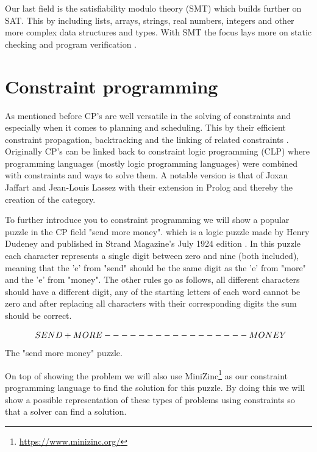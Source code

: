 Our last field is the satisfiability modulo theory (SMT) which builds further on SAT. This by including lists, arrays, strings, real numbers, integers and other more complex data structures and types. With SMT the focus lays more on static checking and program verification \cite{56bardin2019bringing, 54moura2008z3}.


\section{Constraint programming}
\label{CS:CP}
As mentioned before CP's are well versatile in the solving of constraints and especially when it comes to planning and scheduling. This by their efficient constraint propagation, backtracking and the linking of related constraints \cite{66WikiCP}. Originally CP's can be linked back to constraint logic programming (CLP) where programming languages (mostly logic programming languages) were combined with constraints and ways to solve them. A notable version is that of Joxan Jaffart and Jean-Louis Lassez \cite{65jaffar1987constraint, 66WikiCP} with their extension in Prolog and thereby the creation of the category.

To further introduce you to constraint programming we will show a popular puzzle in the CP field "send more money". which is a logic puzzle made by Henry Dudeney and published in Strand Magazine's July 1924 edition \cite{sendMoreMoney}.
In this puzzle each character represents a single digit between zero and nine (both included), meaning that the 'e' from "send" should be the same digit as the 'e' from "more" and the 'e' from "money". The other rules go as follows, all different characters should have a different digit, any of the starting letters of each word cannot be zero and after replacing all characters with their corresponding digits the sum should be correct. 
\begin{center}
	\[$$
	\; \; S E N D\\
	+ M O R E\\
	-----------------\\
	M O N E Y
	$$\] The "send more money" puzzle.
\end{center}

On top of showing the problem we will also use MiniZinc\footnote{\url{https://www.minizinc.org/}} as our constraint programming language to find the solution for this puzzle. By doing this we will show a possible representation of these types of problems using constraints so that a solver can find a solution.

